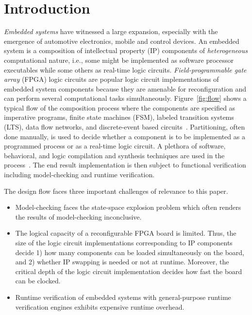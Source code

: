 \section{Introduction}
\label{sect-intro}

\begin{figure*}
\resizebox{1.9\columnwidth}{!}{
  
}
\caption{Embedded system specification, refinement, and implementation stages}
\label{fig:flow}
\end{figure*}

\emph{Embedded systems} have witnessed a large 
expansion, especially with  the emergence of automotive 
electronics, mobile and control devices.
%
An embedded system is a composition of intellectual property (IP) components
of \emph{heterogeneous} computational nature, i.e., some might be implemented as software 
processor executables while some others as real-time logic circuits. 
\emph{Field-programmable gate array} (FPGA) logic circuits are popular logic circuit 
implementations of embedded system components because they are amenable for reconfiguration and can perform several computational tasks simultaneously. 
%
Figure~\ref{fig:flow} shows a typical flow of the composition process where the
components are specified as imperative programs, finite state machines (FSM), labeled 
transition systems (LTS), data flow networks, and discrete-event based circuits~\cite{henzinger2006embedded}.
Partitioning, often done manually, is used to decide whether a component is to 
be implemented as a programmed process or as a real-time logic circuit. 
A plethora of software, behavioral, and logic compilation and synthesis techniques are
used in the process~\cite{metropolis2}.
The end result implementation is then subject to functional verification including 
model-checking and runtime verification. 

The design flow faces three important challenges of relevance to this paper. 

\begin{itemize}
\item Model-checking faces the state-space explosion problem which often renders the results of model-checking inconclusive. 
\item The logical capacity of a reconfigurable FPGA board is limited.
Thus, the size of the logic circuit implementations corresponding to IP components decide 1) how many components can be loaded simultaneously on the board, and 2) whether IP swapping is needed or not at runtime.
Moreover, the critical depth of the logic circuit implementation decides how fast the board can be clocked.
\item Runtime verification of embedded systems with general-purpose runtime verification engines exhibits expensive runtime overhead. 
\end{itemize}

